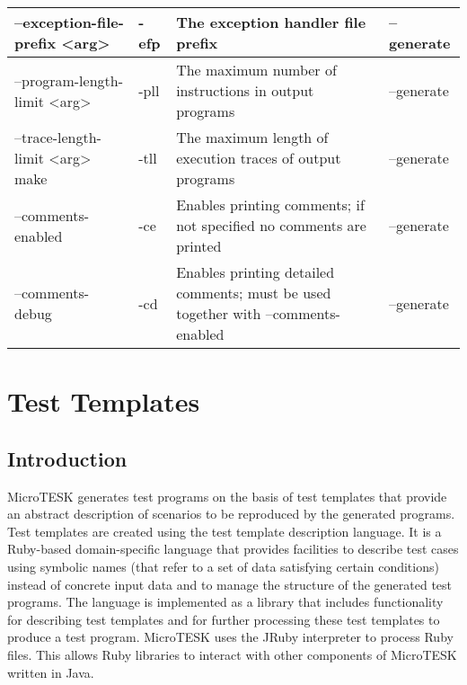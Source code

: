 \documentclass[oneside,final,14pt]{extreport}
\begin{document}
\begin{tabular}{ | p{4cm} | p{1cm} | p{5cm} | p{3cm} |}
  --exception-file-prefix <arg> & -efp & The exception handler file prefix & --generate \\ \hline
  --program-length-limit <arg> & -pll & The maximum number of instructions in output programs & --generate \\ \hline
  --trace-length-limit <arg> make& -tll & The maximum length of execution traces of output programs & --generate \\ \hline
  --comments-enabled & -ce & Enables printing comments; if not specified no comments are printed & --generate \\ \hline
  --comments-debug & -cd & Enables printing detailed comments; must be used together with --comments-enabled  & --generate \\ \hline
\end{tabular}


\chapter{Test Templates}


\section{Introduction}

MicroTESK generates test programs on the basis of test templates that provide
an abstract description of scenarios to be reproduced by the generated programs.
Test templates are created using the test template description language. It is
a Ruby-based domain-specific language that provides facilities to describe test
cases using symbolic names (that refer to a set of data satisfying certain
conditions) instead of concrete input data and to manage the structure of the
generated test programs. The language is implemented as a library that includes
functionality for describing test templates and for further processing these test
templates to produce a test program. MicroTESK uses the JRuby interpreter to process
Ruby files. This allows Ruby libraries to interact with other components of MicroTESK
written in Java.

\end{document}
